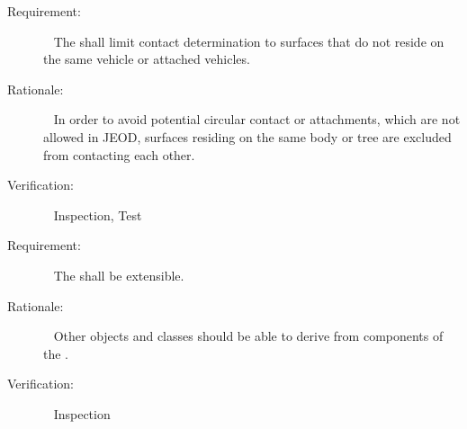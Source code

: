 \label{reqt:Circular_Contact}
\begin{description}
  \item[Requirement:]\ \newline
    The \ModelDesc shall limit contact determination to surfaces that do not reside on the same vehicle or attached vehicles.
  \item[Rationale:]\ \newline
     In order to avoid potential circular contact or attachments, which are not allowed in JEOD, surfaces residing on the same
     body or tree are excluded from contacting each other.
  \item[Verification:]\ \newline
    Inspection, Test
\end{description}

\label{reqt:contact_extend}
  \begin{description}
    \item[Requirement:]\ \newline
    The \ModelDesc shall be extensible.
    \item[Rationale:]\ \newline
    Other objects and classes should be able to derive from components of the \ModelDesc.
    \item[Verification:]\ \newline
    Inspection
  \end{description}

